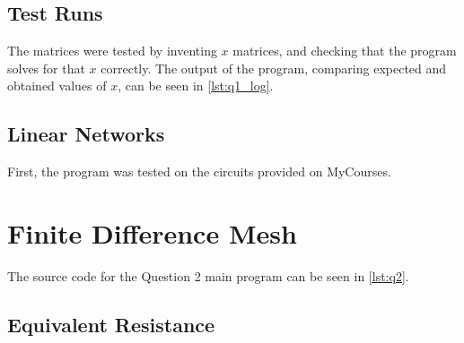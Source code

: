 \documentclass[a4paper,titlepage]{article}
\begin{document}
	\subsection{Test Runs}
	
	The matrices were tested by inventing $x$ matrices, and checking that the program solves for that $x$ correctly. The output of the program, comparing expected and obtained values of $x$, can be seen in \autoref{lst:q1_log}.
	
	\subsection{Linear Networks}
	
	First, the program was tested on the circuits provided on MyCourses.
	
	
	\section{Finite Difference Mesh}
	
	The source code for the Question 2 main program can be seen in \autoref{lst:q2}.
	
	\subsection{Equivalent Resistance}
	
\end{document}
